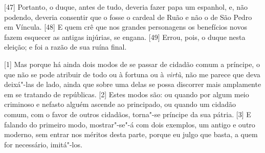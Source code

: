 {[}47{]}
Portanto, o duque, antes de tudo, deveria fazer papa um espanhol, e, não
podendo, deveria consentir que o fosse o cardeal de Ruão e não o de São
Pedro em Víncula. {[}48{]} E quem crê que nos grandes personagens os 
benefícios novos fazem esquecer as antigas injúrias, se engana. {[}49{]}
Errou, pois, o duque nesta eleição; e foi a razão de sua ruína final.


{[}1{]} Mas porque há ainda dois modos de se passar de cidadão comum a
príncipe, o que não se pode atribuir de
todo ou à fortuna ou à \emph{virtù}, não me parece que deva deixá"-las de
lado, ainda que sobre uma delas se possa discorrer mais amplamente em se
tratando de repúblicas. {[}2{]} Estes modos são: ou quando
por algum meio criminoso e nefasto alguém ascende ao principado, ou
quando um cidadão comum, com o favor de outros cidadãos, torna"-se
príncipe da sua pátria. {[}3{]} E falando do primeiro modo, mostrar"-se"-á
com dois exemplos, um antigo e outro moderno, sem entrar nos méritos
desta parte, porque eu julgo que basta, a quem for necessário,
imitá"-los.

